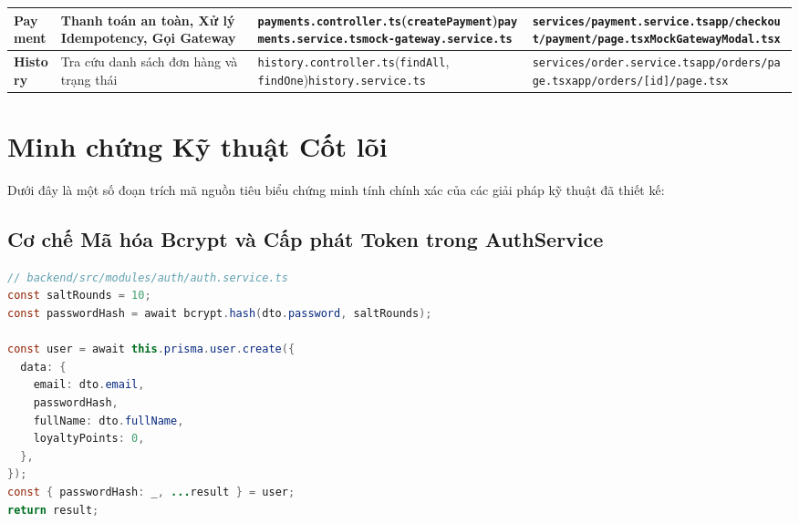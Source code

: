 \begin{table}[htbp]
\begin{tabularx}{\textwidth}{lp{3.2cm}Xp{4.3cm}}
\midrule
\textbf{Payment} & Thanh toán an toàn, Xử lý Idempotency, Gọi Gateway & \texttt{payments.controller.ts}\newline (\texttt{createPayment})\newline \texttt{payments.service.ts}\newline \texttt{mock-gateway.service.ts} & \texttt{services/payment.service.ts}\newline \texttt{app/checkout/payment/page.tsx}\newline \texttt{MockGatewayModal.tsx} \\
\midrule
\textbf{History} & Tra cứu danh sách đơn hàng và trạng thái & \texttt{history.controller.ts}\newline (\texttt{findAll}, \texttt{findOne})\newline \texttt{history.service.ts} & \texttt{services/order.service.ts}\newline \texttt{app/orders/page.tsx}\newline \texttt{app/orders/[id]/page.tsx} \\
\bottomrule
\end{tabularx}
\end{table}

\section{Minh chứng Kỹ thuật Cốt lõi}
Dưới đây là một số đoạn trích mã nguồn tiêu biểu chứng minh tính chính xác của các giải pháp kỹ thuật đã thiết kế:

\subsection{Cơ chế Mã hóa Bcrypt và Cấp phát Token trong AuthService}
\begin{lstlisting}[language=Java]
// backend/src/modules/auth/auth.service.ts
const saltRounds = 10;
const passwordHash = await bcrypt.hash(dto.password, saltRounds);

const user = await this.prisma.user.create({
  data: {
    email: dto.email,
    passwordHash,
    fullName: dto.fullName,
    loyaltyPoints: 0,
  },
});
const { passwordHash: _, ...result } = user;
return result;
\end{lstlisting}

